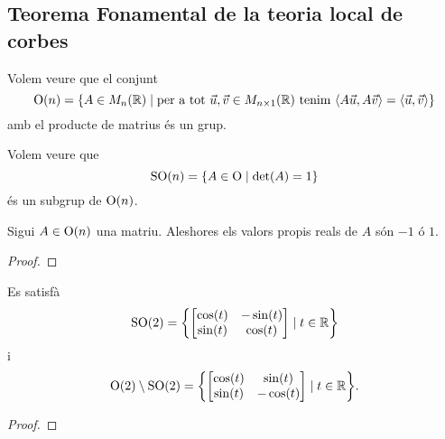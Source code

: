 \documentclass[../../Main.tex]{subfiles}
\begin{document}
	\subsection{Teorema Fonamental de la teoria local de corbes}
	\begin{example}
		\label{ex:grup ortogonal}
		Volem veure que el conjunt
		\[
		    \GrupOrtogonal(n)=\{A\in\matrius_{n}(\mathbb{R})\mid\text{per a tot }\vec{u},\vec{v}\in\matrius_{n\times1}(\mathbb{R})\text{ tenim }\prodesc{A\vec{u}}{A\vec{v}}=\prodesc{\vec{u}}{\vec{v}}\}
		\]
		amb el producte de matrius és un grup.
		\begin{solution}
		\end{solution}
	\end{example}
	\begin{example}
		\label{ex:grup especial ortogonal}
		Volem veure que
		\[
		    \operatorname{SO}(n)=\{A\in\operatorname{O}\mid\det(A)=1\}
		\]
		és un subgrup de \(\operatorname{O}(n)\).
		\begin{solution}
		\end{solution}
	\end{example}
	\begin{proposition}
		\label{prop:els valors propis d'una matriu ortogonal són -1 o 1}
		Sigui \(A\in\operatorname{O}(n)\) una matriu. Aleshores els valors propis reals de \(A\) són \(-1\) ó \(1\).
		\begin{proof}
		\end{proof}
	\end{proposition}
	\begin{proposition}
		\label{prop:caracterització de les matrius ortogonals 2x2}
		Es satisfà
		\[\GrupEspecialOrtogonal(2)=\left\{\begin{bmatrix}
			\cos(t) & -\sin(t) \\
			\sin(t) & \cos(t)
		\end{bmatrix}\mid t\in\mathbb{R}\right\}\]
		i
		\[\GrupOrtogonal(2)\setminus\GrupEspecialOrtogonal(2)=\left\{\begin{bmatrix}
			\cos(t) & \sin(t) \\
			\sin(t) & -\cos(t)
		\end{bmatrix}\mid t\in\mathbb{R}\right\}.\]
		\begin{proof}
		\end{proof}
	\end{proposition}
\end{document}
